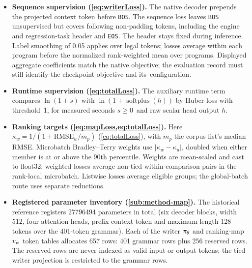 \begin{itemize}[leftmargin=1.4em,itemsep=2pt,topsep=3pt]
  Within-comparison pairs use corpus context and comparison index;
  Python ranking helpers group by dataset identifier. Native pairing skips
  non-finite targets and exact ties, $\kappa_w=\kappa_u$, without an exclusion margin
  or logit rescaling. Training refuses non-finite supervision before loss
  formation. \mbox{} give list-level losses.
  \item \textbf{Sequence supervision (\cref{eq:writerLoss}).} The native decoder
  prepends the projected context token before \texttt{BOS}. The sequence
  loss leaves \texttt{BOS} unsupervised but covers following non-padding
  tokens, including the engine and regression-task header and \texttt{EOS}.
  The header stays fixed during inference. Label smoothing of 0.05 applies
  over legal tokens; losses average within each program before the
  normalized rank-weighted mean over programs. Displayed aggregate
  coefficients match the native objective; the evaluation record must still
  identify the checkpoint objective and \mbox{its configuration}.
  \item \textbf{Runtime supervision (\cref{eq:totalLoss}).}
  The auxiliary runtime term compares $\ln(1+s)$ with
  $\ln(1+\operatorname{softplus}(h))$ by Huber loss with threshold~1,
  for measured seconds \mbox{$s\geq0$ and} raw scalar head output $h$.
  \item \textbf{Ranking targets (\cref{eq:mapLoss,eq:totalLoss}).}
  Here $\kappa_w=1/(1+\mathrm{RMSE}_w/m_p)$ (\cref{eq:totalLoss}), with $m_p$
  the corpus list's median RMSE. Microbatch Bradley--Terry weights use
  $|\kappa_w-\kappa_u|$, doubled when either member is at or above the 90th percentile.
  Weights are mean-scaled and cast to float32; weighted losses average
  non-tied within-comparison pairs in the rank-local microbatch. Listwise
  losses average eligible groups; the global-batch route uses separate reductions.
  \item \textbf{Registered parameter inventory (\cref{sub:method-map}).}
  The historical reference registers \num{27796494} parameters in total (six
  decoder blocks, width 512, four attention heads, prefix context token
  and maximum length 128 tokens over the 401-token grammar).
  Each of the writer $\pi_{\theta}$ and ranking-map $v_{\psi}$ token tables allocates 657 rows:
  401 grammar rows plus 256 reserved rows. The reserved rows
  are never indexed as valid input or output tokens; the tied writer
  projection is restricted to the grammar rows.


\end{itemize}
